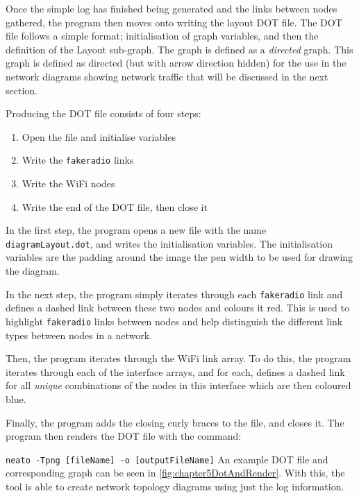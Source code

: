 Once the simple log has finished being generated and the links between nodes gathered, the program then moves onto writing the layout DOT file.
The DOT file follows a simple format; initialisation of graph variables, and then the definition of the Layout sub-graph.
The graph is defined as a \emph{directed} graph.
This graph is defined as directed (but with arrow direction hidden) for the use in the network diagrams showing network traffic that will be discussed in the next section.

Producing the DOT file consists of four steps:
\begin{enumerate}
    \item Open the file and initialise variables
    \item Write the \texttt{fakeradio} links
    \item Write the WiFi nodes
    \item Write the end of the DOT file, then close it
\end{enumerate}

In the first step, the program opens a new file with the name \texttt{diagramLayout.dot}, and writes the initialisation variables.
The initialisation variables are the padding around the image the pen width to be used for drawing the diagram.

In the next step, the program simply iterates through each \texttt{fakeradio} link and defines a dashed link between these two nodes and colours it red.
This is used to highlight \texttt{fakeradio} links between nodes and help distinguish the different link types between nodes in a network.


Then, the program iterates through the WiFi link array. 
To do this, the program iterates through each of the interface arrays, and for each, defines a dashed link for all \emph{unique} combinations of the nodes in this interface which are then coloured blue.

Finally, the program adds the closing curly braces to the file, and closes it.
The program then renders the DOT file with the command:

\texttt{neato -Tpng [fileName] -o [outputFileName]}
An example DOT file and corresponding graph can be seen in \ref{fig:chapter5DotAndRender}.
With this, the tool is able to create network topology diagrams using just the log information.

